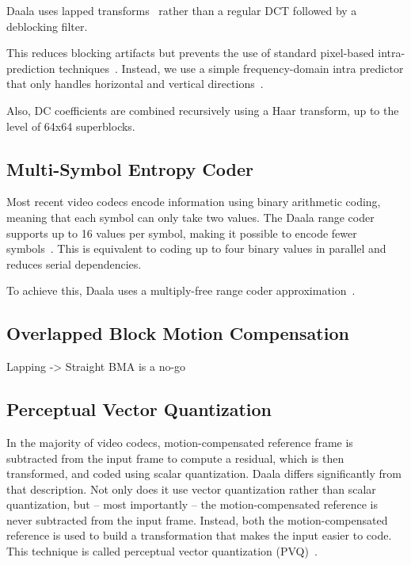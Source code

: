\documentclass[english,conference,10pt]{IEEEtran}
\begin{document}
Daala uses lapped transforms~\cite{MalvarS89,Tran2003} rather than
a regular DCT followed by a deblocking filter. 

This reduces blocking artifacts but prevents the use of standard pixel-based
intra-prediction techniques~\cite{DaedeDCC}. Instead, we use a simple
frequency-domain intra predictor that only handles horizontal and
vertical directions~\cite{EggePCS}. 

Also, DC coefficients are combined recursively using a Haar transform,
up to the level of 64x64 superblocks. 


\subsection{Multi-Symbol Entropy Coder}

Most recent video codecs encode information using binary arithmetic
coding, meaning that each symbol can only take two values. The Daala
range coder supports up to 16 values per symbol, making it possible
to encode fewer symbols~\cite{derfTools}. This is equivalent to
coding up to four binary values in parallel and reduces serial dependencies. 

To achieve this, Daala uses a multiply-free range coder approximation~\cite{stuiver1998piecewise}. 


\subsection{Overlapped Block Motion Compensation}

Lapping -> Straight BMA is a no-go


\subsection{Perceptual Vector Quantization}

In the majority of video codecs, motion-compensated reference frame
is subtracted from the input frame to compute a residual, which is
then transformed, and coded using scalar quantization. Daala differs
significantly from that description. Not only does it use vector quantization
rather than scalar quantization, but -- most importantly -- the motion-compensated
reference is never subtracted from the input frame. Instead, both
the motion-compensated reference is used to build a transformation
that makes the input easier to code. This technique is called perceptual
vector quantization (PVQ)~\cite{valin2015spie}.
\end{document}
